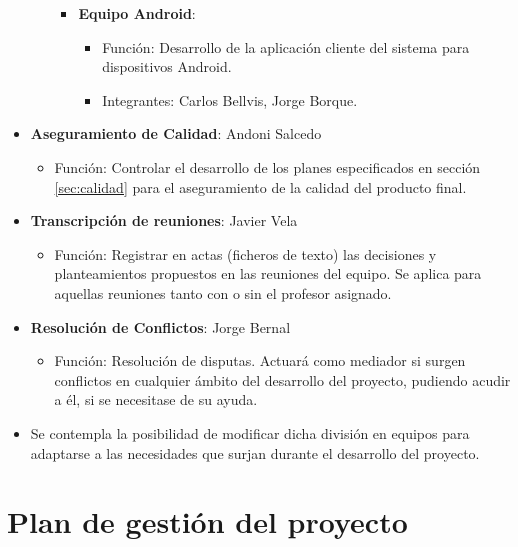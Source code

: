 \documentclass{article}
\begin{document}
\begin{itemize}
\begin{itemize}
\begin{itemize}
\begin{itemize}
           \end{itemize}
           \item \textbf{Equipo Android}:
           \begin{itemize}
               \setlength{\itemsep}{0em}
               \item Función: Desarrollo de la aplicación cliente del sistema para dispositivos Android.
               \item Integrantes: Carlos Bellvis, Jorge Borque.
           \end{itemize}
       \end{itemize}
   \end{itemize}
   \item \textbf{Aseguramiento de Calidad}: Andoni Salcedo
   \begin{itemize}
       \setlength{\itemsep}{0em}
       \item Función: Controlar el desarrollo de los planes especificados en sección \ref{sec:calidad} para el aseguramiento de la calidad del producto final.
   \end{itemize}
   \item \textbf{Transcripción de reuniones}: Javier Vela
   \begin{itemize}
       \setlength{\itemsep}{0em}
       \item Función: Registrar en actas (ficheros de texto) las decisiones y planteamientos propuestos en las reuniones del equipo. Se aplica para aquellas reuniones tanto con o sin el profesor asignado.
   \end{itemize}
   \item \textbf{Resolución de Conflictos}: Jorge Bernal
   \begin{itemize}
       \setlength{\itemsep}{0em}
       \item Función: Resolución de disputas. Actuará como mediador si surgen conflictos en cualquier ámbito del desarrollo del proyecto, pudiendo acudir a él, si se necesitase de su ayuda.
   \end{itemize}
   \item Se contempla la posibilidad de modificar dicha división en equipos para adaptarse a las necesidades que surjan durante el desarrollo del proyecto.
\end{itemize}
 
\pagebreak
 
\section{Plan de gestión del proyecto}
 
\end{document}
